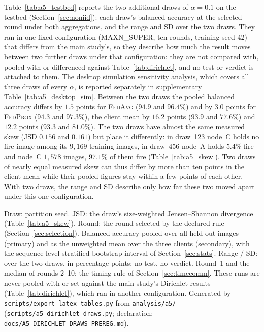 \documentclass[journal]{IEEEtran}
\newcommand{\fedavg}{\textsc{FedAvg}}
\newcommand{\fedprox}{\textsc{FedProx}}
\begin{document}
Table~\ref{tab:a5_testbed} reports the two additional draws of $\alpha=0.1$ on the testbed (Section~\ref{sec:noniid}): each draw's balanced accuracy at the selected round under both aggregations, and the range and SD over the two draws. They ran in one fixed configuration (MAXN\_SUPER, ten rounds, training seed 42) that differs from the main study's, so they describe how much the result moves between two further draws under that configuration; they are not compared with, pooled with or differenced against Table~\ref{tab:dirichlet}, and no test or verdict is attached to them. The desktop simulation sensitivity analysis, which covers all three draws of every $\alpha$, is reported separately in supplementary Table~\ref{tab:a5_desktop_sim}. Between the two draws the pooled balanced accuracy differs by $1.5$ points for \fedavg{} ($94.9$ and $96.4$\%) and by $3.0$ points for \fedprox{} ($94.3$ and $97.3$\%), the client mean by $16.2$ points ($93.9$ and $77.6$\%) and $12.2$ points ($93.3$ and $81.0$\%). The two draws have almost the same measured skew (JSD $0.156$ and $0.161$) but place it differently: in draw~123 node~C holds no fire image among its $9{,}169$ training images, in draw~456 node~A holds $5.4$\% fire and node~C $1{,}578$ images, $97.1$\% of them fire (Table~\ref{tab:a5_skew}). Two draws of nearly equal measured skew can thus differ by more than ten points in the client mean while their pooled figures stay within a few points of each other. With two draws, the range and SD describe only how far these two moved apart under this one configuration.

\begin{table}[t]
\centering
\caption{Additional Draws of the Dirichlet $\alpha=0.1$ Partition on the Testbed (Partition Seeds 123 and 456; All Nodes at MAXN\_SUPER, Ten Rounds, Training Seed 42): Test Balanced Accuracy at the Selected Round; Descriptive Only}
\label{tab:a5_testbed}
\setlength{\tabcolsep}{4pt}
{\footnotesize
}
\vspace{2pt}
\parbox{\textwidth}{\footnotesize Draw: partition seed. JSD: the draw's size-weighted Jensen--Shannon divergence (Table~\ref{tab:a5_skew}). Round: the round selected by the declared rule (Section~\ref{sec:selection}). Balanced accuracy pooled over all held-out images (primary) and as the unweighted mean over the three clients (secondary), with the sequence-level stratified bootstrap interval of Section~\ref{sec:stats}. Range / SD: over the two draws, in percentage points; no test, no verdict. Round~1 and the median of rounds 2--10: the timing rule of Section~\ref{sec:timecomm}. These runs are never pooled with or set against the main study's Dirichlet results (Table~\ref{tab:dirichlet}), which ran in another configuration. Generated by \texttt{scripts/export\_latex\_tables.py} from \texttt{analysis/a5/} (\texttt{scripts/a5\_dirichlet\_draws.py}; declaration: \texttt{docs/A5\_DIRICHLET\_DRAWS\_PREREG.md}).}
\end{table}
\end{document}
